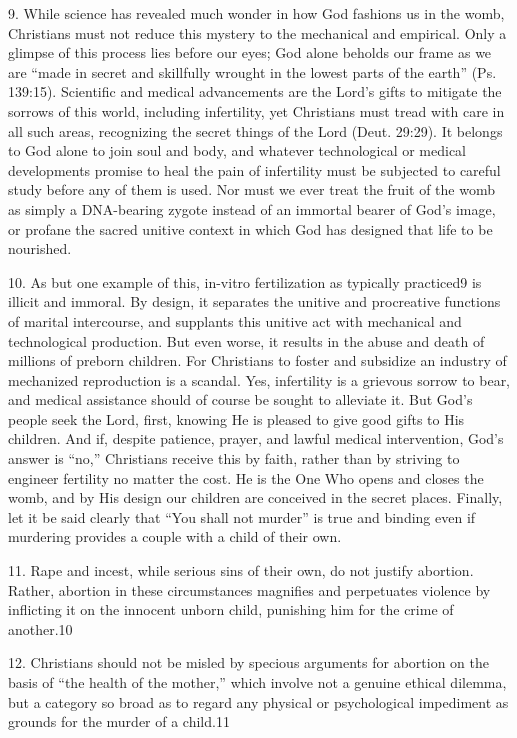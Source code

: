 \documentclass[
]{book}
\begin{document}
\protect\hypertarget{dda-statement-09}{\href{}{}}9. While science has revealed much wonder in how God fashions us in the womb, Christians must not reduce this mystery to the mechanical and empirical. Only a glimpse of this process lies before our eyes; God alone beholds our frame as we are ``made in secret and skillfully wrought in the lowest parts of the earth'' (Ps. 139:15). Scientific and medical advancements are the Lord's gifts to mitigate the sorrows of this world, including infertility, yet Christians must tread with care in all such areas, recognizing the secret things of the Lord (Deut. 29:29). It belongs to God alone to join soul and body, and whatever technological or medical developments promise to heal the pain of infertility must be subjected to careful study before any of them is used. Nor must we ever treat the fruit of the womb as simply a DNA-bearing zygote instead of an immortal bearer of God's image, or profane the sacred unitive context in which God has designed that life to be nourished.

\protect\hypertarget{dda-statement-10}{\href{}{}}10. As but one example of this, in-vitro fertilization as typically practiced9 is illicit and immoral. By design, it separates the unitive and procreative functions of marital intercourse, and supplants this unitive act with mechanical and technological production. But even worse, it results in the abuse and death of millions of preborn children. For Christians to foster and subsidize an industry of mechanized reproduction is a scandal. Yes, infertility is a grievous sorrow to bear, and medical assistance should of course be sought to alleviate it. But God's people seek the Lord, first, knowing He is pleased to give good gifts to His children. And if, despite patience, prayer, and lawful medical intervention, God's answer is ``no,'' Christians receive this by faith, rather than by striving to engineer fertility no matter the cost. He is the One Who opens and closes the womb, and by His design our children are conceived in the secret places. Finally, let it be said clearly that ``You shall not murder'' is true and binding even if murdering provides a couple with a child of their own.

\protect\hypertarget{dda-statement-11}{\href{}{}}11. Rape and incest, while serious sins of their own, do not justify abortion. Rather, abortion in these circumstances magnifies and perpetuates violence by inflicting it on the innocent unborn child, punishing him for the crime of another.10

\protect\hypertarget{dda-statement-12}{\href{}{}}12. Christians should not be misled by specious arguments for abortion on the basis of ``the health of the mother,'' which involve not a genuine ethical dilemma, but a category so broad as to regard any physical or psychological impediment as grounds for the murder of a child.11
\end{document}

